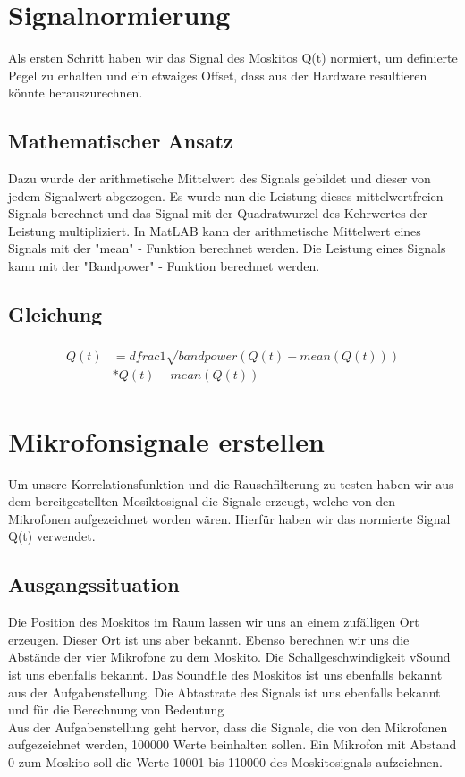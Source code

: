 \section{Signalnormierung}
Als ersten Schritt haben wir das Signal des Moskitos Q(t) normiert, um definierte Pegel zu erhalten und ein etwaiges Offset, dass aus der Hardware resultieren könnte herauszurechnen.
\subsection{Mathematischer Ansatz}
Dazu wurde der arithmetische Mittelwert des Signals gebildet und dieser von jedem Signalwert abgezogen. Es wurde nun die Leistung dieses mittelwertfreien Signals berechnet und das Signal mit der Quadratwurzel des Kehrwertes der Leistung
multipliziert. 
In MatLAB kann der arithmetische Mittelwert eines Signals mit der "mean" - Funktion berechnet werden. Die Leistung eines Signals kann mit der "Bandpower" - Funktion berechnet werden.   
\subsection{Gleichung}
\begin{align}
\begin{split}
Q(t) &= dfrac{1}{\sqrt{bandpower(Q(t)- mean(Q(t)))}} \\ &* Q(t)- mean(Q(t))
\end{split}
\end{align}
\section{Mikrofonsignale erstellen}
Um unsere Korrelationsfunktion und die Rauschfilterung zu testen haben wir aus dem bereitgestellten Mosiktosignal die Signale erzeugt, welche von den Mikrofonen aufgezeichnet worden wären. Hierfür haben wir das normierte Signal Q(t) verwendet. \\ 
\subsection{Ausgangssituation}
Die Position des Moskitos im Raum lassen wir uns an einem zufälligen Ort erzeugen. Dieser Ort ist uns aber bekannt. Ebenso berechnen wir uns die Abstände der vier Mikrofone zu dem Moskito. Die Schallgeschwindigkeit vSound ist uns ebenfalls bekannt. Das Soundfile des Moskitos ist uns ebenfalls bekannt aus der Aufgabenstellung. Die Abtastrate des Signals ist uns ebenfalls bekannt und für die Berechnung von Bedeutung\\
Aus der Aufgabenstellung geht hervor, dass die Signale, die von den Mikrofonen aufgezeichnet werden, 100000 Werte beinhalten sollen. Ein Mikrofon mit Abstand 0 zum Moskito soll die Werte 10001 bis 110000 des Moskitosignals aufzeichnen.

